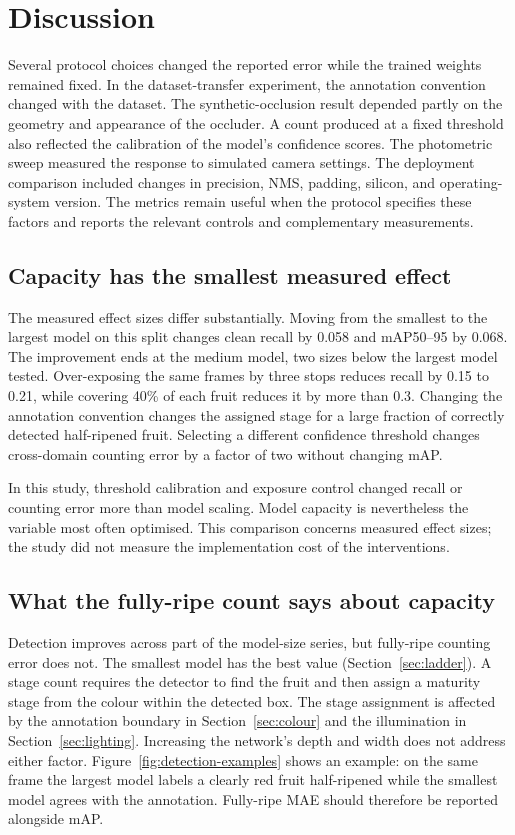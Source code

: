 \section{Discussion}
\label{sec:discussion}

Several protocol choices changed the reported error while the trained weights
remained fixed. In the dataset-transfer experiment, the annotation convention
changed with the dataset. The synthetic-occlusion result depended partly on the
geometry and appearance of the occluder. A count produced at a fixed threshold
also reflected the calibration of the model's confidence scores. The
photometric sweep measured the response to simulated camera settings. The
deployment comparison included changes in precision, NMS, padding, silicon, and
operating-system version. The metrics remain useful when the protocol specifies
these factors and reports the relevant controls and complementary measurements.

\subsection{Capacity has the smallest measured effect}

The measured effect sizes differ substantially. Moving from the smallest to the
largest model on this split changes clean recall by 0.058 and mAP50--95 by
0.068. The improvement ends at the medium model, two sizes below the largest
model tested.
Over-exposing the same frames by three stops reduces recall by 0.15 to 0.21,
while covering 40\% of each fruit reduces it by more than 0.3. Changing the
annotation convention changes the assigned stage for a large fraction of
correctly detected half-ripened fruit. Selecting a different confidence
threshold changes cross-domain counting error by a factor of two without
changing mAP.

In this study, threshold calibration and exposure control changed recall or
counting error more than model scaling. Model capacity is nevertheless the
variable most often optimised. This comparison concerns measured effect sizes;
the study did not measure the implementation cost of the interventions.

\subsection{What the fully-ripe count says about capacity}

Detection improves across part of the model-size series, but fully-ripe counting
error does not. The smallest model has the best value
(Section~\ref{sec:ladder}). A stage count requires the detector to find the
fruit and then assign a maturity stage from the colour within the detected box.
The stage assignment is affected by the annotation boundary in
Section~\ref{sec:colour} and the illumination in Section~\ref{sec:lighting}.
Increasing the network's depth and width does not address either factor.
Figure~\ref{fig:detection-examples} shows an example: on the same frame the
largest model labels a clearly red fruit half-ripened while the smallest model
agrees with the annotation. Fully-ripe MAE should therefore be reported
alongside mAP.


